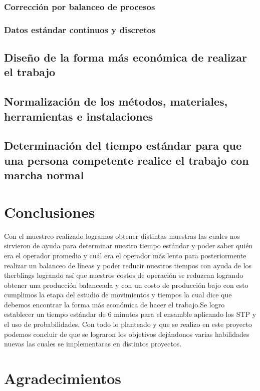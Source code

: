 \subsubsection{Corrección por balanceo de procesos}
% 
% 
\subsubsection{Datos estándar continuos y discretos}
% 
% 
\subsection{Diseño de la forma más económica de realizar el trabajo}

% 
% 
\subsection{Normalización de los métodos, materiales, herramientas e instalaciones}

% 
% 
\subsection{Determinación del tiempo estándar para que una persona competente realice el trabajo con marcha normal}


% 
% 
\section{Conclusiones}

Con el muestreo realizado logramos obtener distintas muestras las cuales nos sirvieron de ayuda para determinar nuestro tiempo estándar y poder saber quién era el operador promedio y cuál era el operador más lento para posteriormente realizar un balanceo de líneas y poder reducir nuestros tiempos con ayuda de los therblings logrando así que nuestros costos de operación se reduzcan logrando obtener una producción balanceada y con un costo de producción bajo con esto cumplimos la etapa del estudio de movimientos y tiempos la cual dice que debemos encontrar la forma más económica de hacer el trabajo.Se logro establecer un tiempo estándar de  6 minutos para el ensamble aplicando los STP y el uso de probabilidades. 
Con todo lo planteado y que se realizo en este proyecto podemos concluir de que se lograron los objetivos dejándonos varias habilidades nuevas las cuales se implementaras en distintos proyectos.

\section{Agradecimientos}

